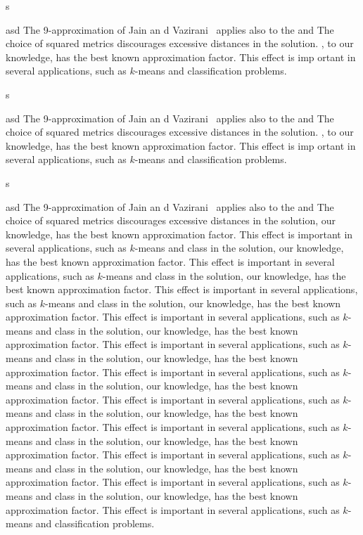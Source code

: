 s

\item asd The 9-approximation of Jain
an d Vazirani~\cite{JainV01} applies also
  to the \smflp and
  The choice of squared metrics discourages excessive distances in the solution.
  , to our knowledge, has the best known approximation factor.
  This effect is imp
  ortant
   in several applications, such as $k$-means and
  classification problems.

s

\item asd The 9-approximation of Jain
an d Vazirani~\cite{JainV01} applies also
  to the \smflp and
  The choice of squared metrics discourages excessive distances in the solution.
  , to our knowledge, has the best known approximation factor.
  This effect is imp
  ortant
   in several applications, such as $k$-means and
  classification problems.

s

\item asd The 9-approximation of Jain an d Vazirani~\cite{JainV01} applies also
  to the \smflp and The choice of squared metrics discourages excessive
  distances in the solution,  our knowledge, has the best known approximation
  factor. This effect is important in several applications, such as $k$-means
  and class in the solution,  our knowledge, has the best known approximation
  factor. This effect is important in several applications, such as $k$-means
  and class in the solution,  our knowledge, has the best known approximation
  factor. This effect is important in several applications, such as $k$-means
  and class in the solution,  our knowledge, has the best known approximation
  factor. This effect is important in several applications, such as $k$-means
  and class in the solution,  our knowledge, has the best known approximation
  factor. This effect is important in several applications, such as $k$-means
  and class in the solution,  our knowledge, has the best known approximation
  factor. This effect is important in several applications, such as $k$-means
  and class in the solution,  our knowledge, has the best known approximation
  factor. This effect is important in several applications, such as $k$-means
  and class in the solution,  our knowledge, has the best known approximation
  factor. This effect is important in several applications, such as $k$-means
  and class in the solution,  our knowledge, has the best known approximation
  factor. This effect is important in several applications, such as $k$-means
  and class in the solution,  our knowledge, has the best known approximation
  factor. This effect is important in several applications, such as $k$-means
  and class in the solution,  our knowledge, has the best known approximation
  factor. This effect is important in several applications, such as $k$-means
  and classification problems.

